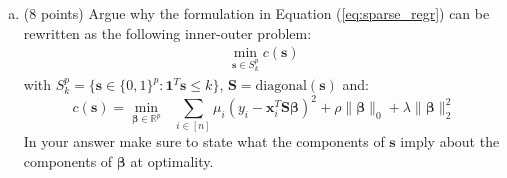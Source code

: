 \documentclass{article}%
\newcommand{\R}{\mathbb{R}}
\begin{document}
\begin{enumerate}[(a)]
    \item (8 points) Argue why the formulation in Equation (\ref{eq:sparse_regr}) can be rewritten as the following inner-outer problem:
    \begin{equation}
    \label{eq:outer}
    \begin{aligned}
        \min_{\bm{s}\in S_k^p}c(\bm{s})
        \end{aligned}
    \end{equation}
    with $S_k^p=\{\bm{s}\in\{0,1\}^p:\bm{1}^T\bm{s}\leq k\}$, $\bm{S}=\text{diagonal}(\bm{s})$ and:
    \begin{equation}\label{eq:s_inner}
        c(\bm{s})=\min_{\boldsymbol{\beta}\in \R^p} \text{  }\sum_{i\in[n]} \mu_i(y_i - \mathbf{x}^T_i \bm{S}\boldsymbol{\beta})^2  + \rho \| \boldsymbol{\beta} \|_0+\lambda \|\bm{\beta}\|_2^2
    \end{equation}
    In your answer make sure to state what the components of $\bm{s}$ imply about the components of $\bm{\beta}$ at optimality.
    

\end{enumerate}
\end{document}
